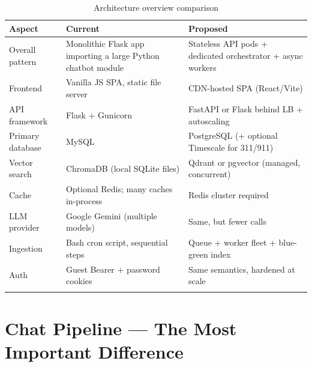 \documentclass[11pt,a4paper]{article}
\begin{document}
\begin{longtable}{@{}p{3.2cm}p{5.3cm}p{5.3cm}@{}}
\toprule
\textbf{Aspect} & \textbf{Current} & \textbf{Proposed} \\
\midrule
\endhead
Overall pattern & Monolithic Flask app importing a large Python chatbot module & Stateless API pods + dedicated orchestrator + async workers \\
Frontend & Vanilla JS SPA, static file server & CDN-hosted SPA (React/Vite) \\
API framework & Flask + Gunicorn & FastAPI or Flask behind LB + autoscaling \\
Primary database & MySQL & PostgreSQL (+ optional Timescale for 311/911) \\
Vector search & ChromaDB (local SQLite files) & Qdrant or pgvector (managed, concurrent) \\
Cache & Optional Redis; many caches in-process & Redis cluster required \\
LLM provider & Google Gemini (multiple models) & Same, but fewer calls \\
Ingestion & Bash cron script, sequential steps & Queue + worker fleet + blue-green index \\
Auth & Guest Bearer + password cookies & Same semantics, hardened at scale \\
\bottomrule
\caption{Architecture overview comparison}
\end{longtable}

\section{Chat Pipeline --- The Most Important Difference}
\end{document}
